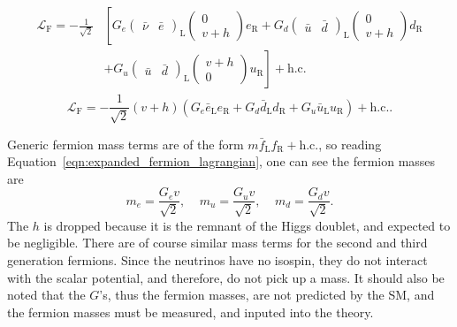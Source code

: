 \begin{align}
  \begin{split}
    \mathcal{L}_\mathrm{F} =
      - \frac{1}{\sqrt{2}}
      &
      \left[
      G_e
    \begin{pmatrix} \bar{\nu} & \bar{e} \end{pmatrix}_\mathrm{L}
    \begin{pmatrix} 0 \\ v+h \end{pmatrix}
      e_\mathrm{R}
      + G_d
    \begin{pmatrix} \bar{u} & \bar{d} \end{pmatrix}_\mathrm{L}
    \begin{pmatrix} 0 \\ v+h \end{pmatrix}
      d_\mathrm{R}
      \right.
      \\
      &
      \left.
      + G_u
    \begin{pmatrix} \bar{u} & \bar{d} \end{pmatrix}_\mathrm{L}
    \begin{pmatrix} v+h \\ 0 \end{pmatrix}
      u_\mathrm{R}
    \right]
    + \mathrm{h.c.}
  \end{split}
\end{align}
\begin{equation}
  \mathcal{L}_\mathrm{F} =
  - \frac{1}{\sqrt{2}}
  (v+h)
  \left(
    G_e \bar{e}_\mathrm{L} e_\mathrm{R} +
    G_d \bar{d}_\mathrm{L} d_\mathrm{R} +
    G_u \bar{u}_\mathrm{L} u_\mathrm{R}
  \right) + \mathrm{h.c.}.
  \label{eqn:expanded_fermion_lagrangian}
\end{equation}

Generic fermion mass terms are of the form
$m \bar{f}_\mathrm{L} f_\mathrm{R} + \mathrm{h.c.}$, so reading
Equation~\ref{eqn:expanded_fermion_lagrangian}, one can see the fermion masses
are
\begin{equation}
    m_e = \frac{G_e v}{\sqrt{2}},~~~~~
    m_u = \frac{G_u v}{\sqrt{2}},~~~~~
    m_d = \frac{G_d v}{\sqrt{2}}.
\end{equation}
The $h$ is dropped because it is the remnant of the Higgs doublet, and expected
to be negligible.
There are of course similar mass terms for the second and third generation
fermions.
Since the neutrinos have no isospin, they do not interact with the scalar
potential, and therefore, do not pick up a mass.
It should also be noted that the $G$'s, thus the fermion masses, are not
predicted by the SM, and the fermion masses must be measured, and inputed
into the theory.

